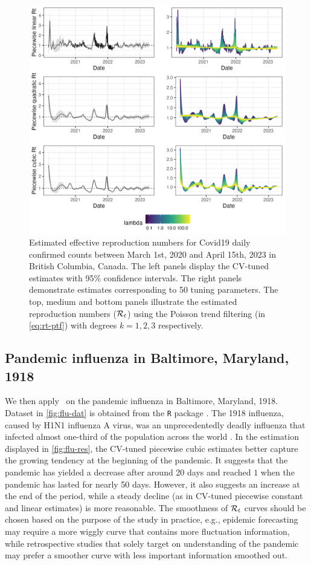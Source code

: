 \begin{figure}[tb]
    \centering
    \includegraphics[width=0.9\linewidth]{fig/covid_full_res.png}
    \caption{Estimated effective reproduction numbers for Covid19 daily confirmed counts between March 1st, 2020 and April 15th, 2023 in British Columbia, Canada. The left panels display the CV-tuned estimates with 95\% confidence intervals. The right panels demonstrate estimates corresponding to 50 tuning parameters. The top, medium and bottom panels illustrate the estimated reproduction numbers ($\mathcal{R}_t$) using the Poisson trend filtering (in \eqref{eq:rt-ptf}) with degrees $k=1,2,3$ respectively.} 
    \label{fig:covid-rt}
\end{figure} 


\subsection{Pandemic influenza in Baltimore, Maryland, 1918}

We then apply \RtEstim\ on the pandemic influenza in Baltimore, Maryland, 1918. Dataset in \autoref{fig:flu-dat} is obtained from the \texttt{R} package \EpiEstim. The 1918 influenza, caused by H1N1 influenza A virus, was an unprecedentedly deadly influenza that infected almost one-third of the population across the world \citep{taubenberger20061918}. 
In the estimation displayed in \autoref{fig:flu-res}, the CV-tuned piecewise
cubic estimates better capture the growing tendency at the beginning of the
pandemic. It suggests that the pandemic has yielded a decrease after around 20
days and reached $1$ when the pandemic has lasted for nearly 50 days. However,
it also suggests an increase at the end of the period, while a steady decline
(as in CV-tuned piecewise constant and linear estimates) is more reasonable. The
smoothness of $\mathcal{R}_t$ curves should be chosen based on the purpose of the
study in practice, e.g., epidemic forecasting may require a more wiggly curve
that contains more fluctuation information, while retrospective studies that
solely target on understanding of the pandemic may prefer a smoother curve with
less important information smoothed out. 

